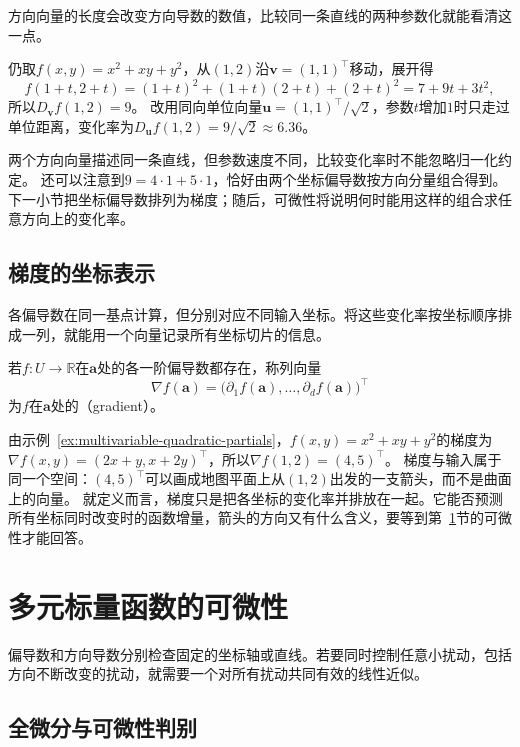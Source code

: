 方向向量的长度会改变方向导数的数值，比较同一条直线的两种参数化就能看清这一点。
\begin{example}[沿对角方向的方向导数]
\label{ex:multivariable-diagonal-directional-derivative}
仍取$f(x,y)=x^2+xy+y^2$，从$(1,2)$沿$\bm v=(1,1)^\top$移动，展开得
\[
 f(1+t,2+t)=(1+t)^2+(1+t)(2+t)+(2+t)^2=7+9t+3t^2,
\]
所以$D_{\bm v}f(1,2)=9$。
改用同向单位向量$\bm u=(1,1)^\top/\sqrt2$，参数$t$增加$1$时只走过单位距离，变化率为$D_{\bm u}f(1,2)=9/\sqrt2\approx6.36$。
\end{example}

两个方向向量描述同一条直线，但参数速度不同，比较变化率时不能忽略归一化约定。
还可以注意到$9=4\cdot1+5\cdot1$，恰好由两个坐标偏导数按方向分量组合得到。下一小节把坐标偏导数排列为梯度；随后，可微性将说明何时能用这样的组合求任意方向上的变化率。

\subsection{梯度的坐标表示}

各偏导数在同一基点计算，但分别对应不同输入坐标。将这些变化率按坐标顺序排成一列，就能用一个向量记录所有坐标切片的信息。
\begin{definition}[梯度]
\label{def:multivariable-gradient}
若$f:U\to\mathbb R$在$\bm a$处的各一阶偏导数都存在，称列向量
\[
 \nabla f(\bm a)=\bigl(\partial_1f(\bm a),\ldots,\partial_df(\bm a)\bigr)^\top
\]
为$f$在$\bm a$处的（gradient）。
\end{definition}
由示例~\ref{ex:multivariable-quadratic-partials}，$f(x,y)=x^2+xy+y^2$的梯度为$\nabla f(x,y)=(2x+y,x+2y)^\top$，所以$\nabla f(1,2)=(4,5)^\top$。
梯度与输入属于同一个空间：$(4,5)^\top$可以画成地图平面上从$(1,2)$出发的一支箭头，而不是曲面上的向量。
就定义而言，梯度只是把各坐标的变化率并排放在一起。它能否预测所有坐标同时改变时的函数增量，箭头的方向又有什么含义，要等到第~\ref{sec:multivariable-total-differentiation}节的可微性才能回答。

\section{多元标量函数的可微性}
\label{sec:multivariable-total-differentiation}

偏导数和方向导数分别检查固定的坐标轴或直线。若要同时控制任意小扰动，包括方向不断改变的扰动，就需要一个对所有扰动共同有效的线性近似。

\subsection{全微分与可微性判别}

